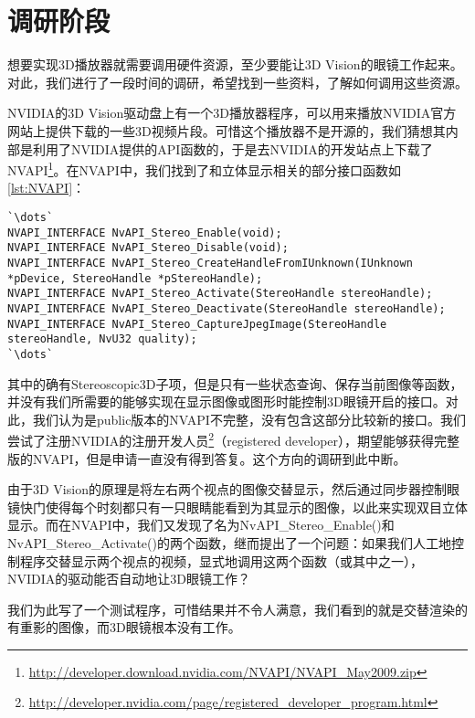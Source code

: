 \section{调研阶段}
\label{sec:3Dplayersurvey}

想要实现3D播放器就需要调用硬件资源，至少要能让3D Vision的眼镜工作起来。对此，我们进行了一段时间的调研，希望找到一些资料，了解如何调用这些资源。


NVIDIA的3D Vision驱动盘上有一个3D播放器程序，可以用来播放NVIDIA官方网站上提供下载的一些3D视频片段。可惜这个播放器不是开源的，我们猜想其内部是利用了NVIDIA提供的API函数的，于是去NVIDIA的开发站点上下载了NVAPI\footnote{\url{http://developer.download.nvidia.com/NVAPI/NVAPI_May2009.zip}}。在NVAPI中，我们找到了和立体显示相关的部分接口函数如\autoref{lst:NVAPI}：

\begin{lstlisting}[caption = {NVAPI中立体显示的部分函数}, label = lst:NVAPI]
`\dots`
NVAPI_INTERFACE NvAPI_Stereo_Enable(void);
NVAPI_INTERFACE NvAPI_Stereo_Disable(void);
NVAPI_INTERFACE NvAPI_Stereo_CreateHandleFromIUnknown(IUnknown *pDevice, StereoHandle *pStereoHandle);
NVAPI_INTERFACE NvAPI_Stereo_Activate(StereoHandle stereoHandle);
NVAPI_INTERFACE NvAPI_Stereo_Deactivate(StereoHandle stereoHandle);
NVAPI_INTERFACE NvAPI_Stereo_CaptureJpegImage(StereoHandle stereoHandle, NvU32 quality);
`\dots`
\end{lstlisting}

其中的确有Stereoscopic3D子项，但是只有一些状态查询、保存当前图像等函数，并没有我们所需要的能够实现在显示图像或图形时能控制3D眼镜开启的接口。对此，我们认为是public版本的NVAPI不完整，没有包含这部分比较新的接口。我们尝试了注册NVIDIA的注册开发人员\footnote{\url{http://developer.nvidia.com/page/registered_developer_program.html}}（registered developer），期望能够获得完整版的NVAPI，但是申请一直没有得到答复。这个方向的调研到此中断。


由于3D Vision的原理是将左右两个视点的图像交替显示，然后通过同步器控制眼镜快门使得每个时刻都只有一只眼睛能看到为其显示的图像，以此来实现双目立体显示。而在NVAPI中，我们又发现了名为NvAPI\_Stereo\_Enable()和NvAPI\_Stereo\_Activate()的两个函数，继而提出了一个问题：如果我们人工地控制程序交替显示两个视点的视频，显式地调用这两个函数（或其中之一），NVIDIA的驱动能否自动地让3D眼镜工作？

我们为此写了一个测试程序，可惜结果并不令人满意，我们看到的就是交替渲染的有重影的图像，而3D眼镜根本没有工作。

